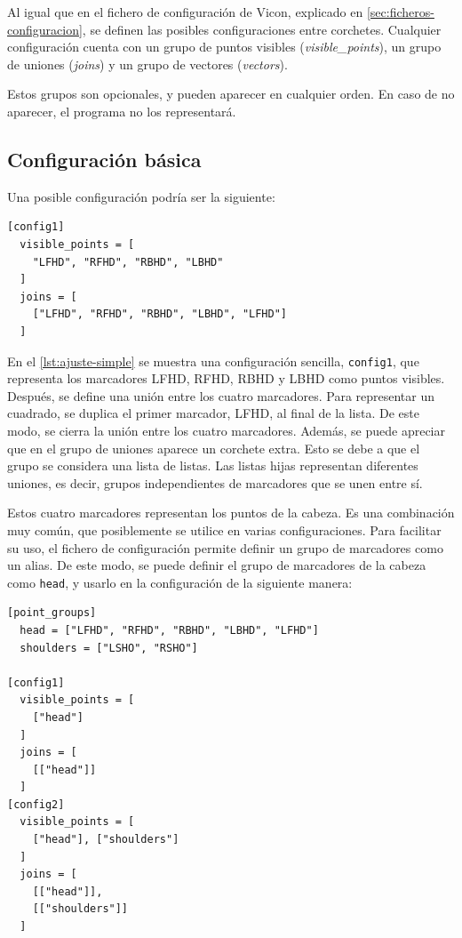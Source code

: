 Al igual que en el fichero de configuración de Vicon, explicado en \autoref{sec:ficheros-configuracion}, se definen las posibles configuraciones entre corchetes. Cualquier configuración cuenta con un grupo de puntos visibles (\textit{visible\_points}), un grupo de uniones (\textit{joins}) y un grupo de vectores (\textit{vectors}).

Estos grupos son opcionales, y pueden aparecer en cualquier orden. En caso de no aparecer, el programa no los representará.

\subsection{Configuración básica}

Una posible configuración podría ser la siguiente:

\begin{lstlisting}[style=mystyle, caption={Ejemplo simple de un fichero de configuración}, label={lst:ajuste-simple}]
[config1]
  visible_points = [
    "LFHD", "RFHD", "RBHD", "LBHD"
  ]
  joins = [
    ["LFHD", "RFHD", "RBHD", "LBHD", "LFHD"]
  ]
\end{lstlisting}

En el \autoref{lst:ajuste-simple} se muestra una configuración sencilla, \texttt{config1}, que representa los marcadores \ac{LFHD}, \ac{RFHD}, \ac{RBHD} y \ac{LBHD} como puntos visibles. Después, se define una unión entre los cuatro marcadores. Para representar un cuadrado, se duplica el primer marcador, \ac{LFHD}, al final de la lista. De este modo, se cierra la unión entre los cuatro marcadores. Además, se puede apreciar que en el grupo de uniones aparece un corchete extra. Esto se debe a que el grupo se considera una lista de listas. Las listas hijas representan diferentes uniones, es decir, grupos independientes de marcadores que se unen entre sí.

Estos cuatro marcadores representan los puntos de la cabeza. Es una combinación muy común, que posiblemente se utilice en varias configuraciones. Para facilitar su uso, el fichero de configuración permite definir un grupo de marcadores como un alias. De este modo, se puede definir el grupo de marcadores de la cabeza como \texttt{head}, y usarlo en la configuración de la siguiente manera:

\begin{lstlisting}[style=mystyle, caption={Ejemplo de un grupo de puntos}, label={lst:grupos-puntos}]
[point_groups]
  head = ["LFHD", "RFHD", "RBHD", "LBHD", "LFHD"]
  shoulders = ["LSHO", "RSHO"]

[config1]
  visible_points = [
    ["head"]
  ]
  joins = [
    [["head"]]
  ]
[config2]
  visible_points = [
    ["head"], ["shoulders"]
  ]
  joins = [
    [["head"]], 
    [["shoulders"]]
  ]
\end{lstlisting}

